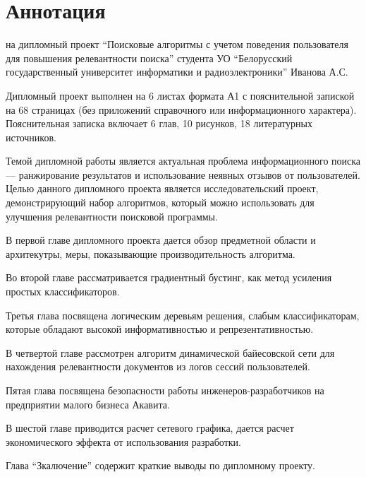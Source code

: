 \section*{Аннотация}
\thispagestyle{empty}

\begin{center}
  \begin{minipage}{0.8\textwidth}
    на дипломный проект ``Поисковые алгоритмы с учетом поведения пользователя для повышения релевантности поиска'' студента УО ``Белорусский государственный университет информатики и радиоэлектроники'' Иванова А.С.
  \end{minipage}
\end{center}

Дипломный проект выполнен на 6 листах формата А1 с пояснительной запиской на 68 страницах (без приложений справочного или информационного характера). Пояснительная записка включает 6 глав, 10 рисунков, 18 литературных источников.

Темой дипломной работы является актуальная проблема информационного поиска --- ранжирование результатов и использование неявных отзывов от пользователей. Целью данного дипломного проекта является исследовательский проект, демонстрирующий набор алгоритмов, который можно использовать для улучшения релевантности поисковой программы. 

В первой главе дипломного проекта дается обзор предметной области и архитекутры, меры, показывающие производительность алгоритма.

Во второй главе рассматривается градиентный бустинг, как метод усиления простых классификаторов.

Третья глава посвящена логическим деревьям решения, слабым классификаторам, которые обладают высокой информативностью и репрезентативностью.

В четвертой главе рассмотрен алгоритм динамической байесовской сети для нахождения релевантности документов из логов сессий пользователей.

Пятая глава посвящена безопасности работы инженеров\hyp{}разработчиков на предприятии малого бизнеса Акавита.

В шестой главе приводится расчет сетевого графика, дается расчет экономического эффекта от использования разработки. 

Глава ``Зкалючение'' содержит краткие выводы по дипломному проекту.

\newpage
